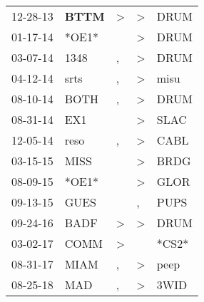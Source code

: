 \begin{supertabular}{p{0.07\textwidth}p{0.06\textwidth}p{0.02\textwidth}p{0.02\textwidth}p{0.06\textwidth}}
 12-28-13\textsuperscript{} &  \textbf{BTTM\textsuperscript{}} &  \textgreater &  \textgreater &  DRUM\textsuperscript{} \\
 01-17-14\textsuperscript{} &                            *OE1* &               &  \textgreater &  DRUM\textsuperscript{} \\
 03-07-14\textsuperscript{} &           1348\textsuperscript{} &             , &  \textgreater &  DRUM\textsuperscript{} \\
 04-12-14\textsuperscript{} &           srts\textsuperscript{} &             , &  \textgreater &  misu\textsuperscript{} \\
 08-10-14\textsuperscript{} &           BOTH\textsuperscript{} &             , &  \textgreater &  DRUM\textsuperscript{} \\
 08-31-14\textsuperscript{} &            EX1\textsuperscript{} &               &  \textgreater &  SLAC\textsuperscript{} \\
 12-05-14\textsuperscript{} &           reso\textsuperscript{} &             , &  \textgreater &  CABL\textsuperscript{} \\
 03-15-15\textsuperscript{} &           MISS\textsuperscript{} &               &  \textgreater &  BRDG\textsuperscript{} \\
 08-09-15\textsuperscript{} &                            *OE1* &               &  \textgreater &  GLOR\textsuperscript{} \\
 09-13-15\textsuperscript{} &           GUES\textsuperscript{} &               &             , &  PUPS\textsuperscript{} \\
 09-24-16\textsuperscript{} &           BADF\textsuperscript{} &  \textgreater &  \textgreater &  DRUM\textsuperscript{} \\
 03-02-17\textsuperscript{} &           COMM\textsuperscript{} &  \textgreater &               &                   *CS2* \\
 08-31-17\textsuperscript{} &           MIAM\textsuperscript{} &             , &  \textgreater &  peep\textsuperscript{} \\
 08-25-18\textsuperscript{} &            MAD\textsuperscript{} &             , &  \textgreater &  3WID\textsuperscript{} \\
\end{supertabular}
